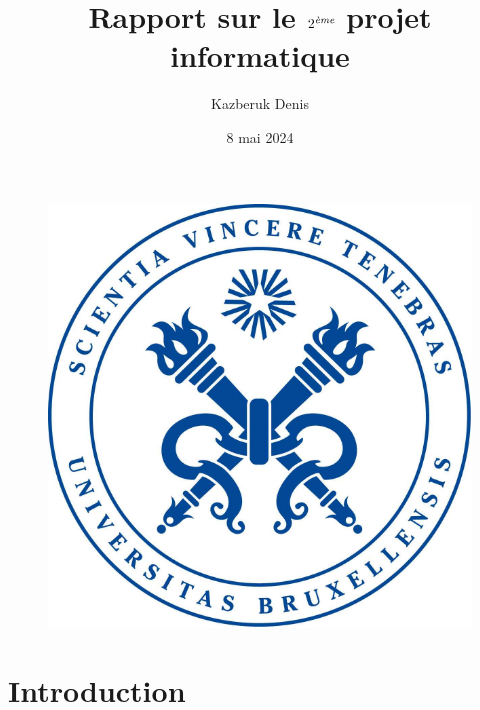 \documentclass[utf8]{article}
\title{Rapport sur le $2^{\emph{ème}}$ projet informatique}
\author{Kazberuk Denis}
\date{8 mai 2024}
\begin{document}
\begin{titlepage}

\maketitle
\vspace{5cm}
\begin{figure}[H]
  \centering
	\includegraphics[scale=0.4]{logo.png}
  \label{fig:logo}
\end{figure}
\end{titlepage}

\tableofcontents

\newpage


\section{Introduction}
\end{document}
